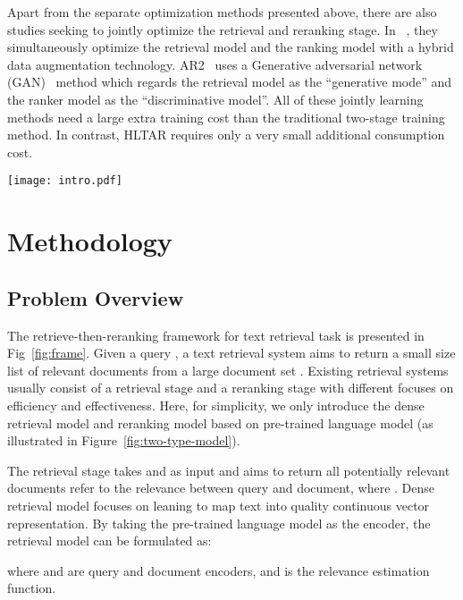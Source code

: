 \documentclass[11pt]{article}
\begin{document}
Apart from the separate optimization methods presented above, there are also studies seeking to jointly optimize the retrieval and reranking stage. In ~\cite{ren2021rocketqav2}, they simultaneously optimize the retrieval model and the ranking model with a hybrid data augmentation technology. AR2~\cite{zhang2021adversarial} uses a Generative adversarial network (GAN)~\cite{creswell2018generative} method which regards the retrieval model as the ``generative mode'' and the ranker model as the ``discriminative model''. All of these jointly learning methods need a large extra training cost than the traditional two-stage training method. In contrast, HLTAR requires only a very small additional consumption cost.

\begin{figure*}
    \centering
    \texttt{[image: intro.pdf]}   
    \caption{An illusion of the conventional retrieve-then-reranking framework (solid line part) and our HLTAR ranking model (solid line and dashed line part).}
    \label{fig:frame}
\end{figure*}


\section{Methodology}

\subsection{Problem Overview}
The retrieve-then-reranking framework for text retrieval task is presented in Fig~\ref{fig:frame}. Given a query , a text retrieval system aims to return a small size list of relevant documents from a large document set . Existing retrieval systems usually consist of a retrieval stage and a reranking stage with different focuses on efficiency and effectiveness. Here, for simplicity, we only introduce the dense retrieval model and reranking model based on pre-trained language model (as illustrated in Figure~\ref{fig:two-type-model}).

The retrieval stage takes  and  as input and aims to return all potentially relevant documents  refer to the relevance between query and document, where . Dense retrieval model focuses on leaning to map text into quality continuous vector representation. By taking the pre-trained language model as the encoder, the retrieval model can be formulated as:

where  and  are query and document encoders, and  is the relevance estimation function.
\end{document}
